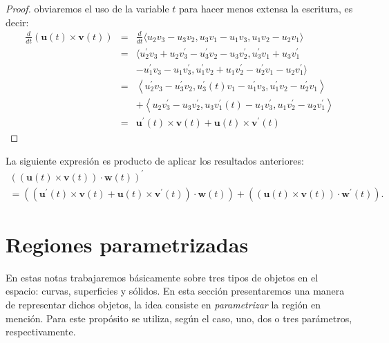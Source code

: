   \begin{proof}
    obviaremos el uso de la variable $t$ para hacer menos extensa la escritura, es decir:
    \begin{eqnarray*}
      \frac{d}{dt}\left( \mathbf{u}(t)\times \mathbf{v}(t)\right) &=& \frac{d}{dt} \langle u_{2} v_{3} -u_{3} v_{2} ,u_{3} v_{1} -u_{1} v_{3} ,u_{1} v_{2} -u_{2} v_{1} \rangle \\
      &=& \big\langle u_{2}^{\prime} v_{3}+u_{2} v_{3}^{\prime} -u_{3}^{\prime} v_{2} -u_{3} v_{2}^{\prime},u_{3}^{\prime} v_{1} +u_{3}v_{1}^{\prime} \\
      && -u_{1}^{\prime}v_{3} -u_{1} v_{3}^{\prime},   u_{1}^{\prime}v_{2}+u_{1}v_{2}^{\prime}  -u_{2}^{\prime} v_{1} -u_{2} v_{1}^{\prime} \big\rangle \\
      &=& \left\langle u_{2}^{\prime} v_{3}-u_{3}^{\prime} v_{2} ,u_{3}^{\prime}(t) v_{1} -u_{1}^{\prime} v_{3},u_{1}^{\prime} v_{2} -u_{2}^{\prime} v_{1} \right\rangle  \\
      && +\left\langle u_{2} v_{3}^{\prime} -u_{3}v_{2}^{\prime} ,u_{3} v_{1}^{\prime}(t) -u_{1} v_{3}^{\prime} ,u_{1} v_{2}^{\prime} -u_{2} v_{1}^{\prime} \right\rangle \\
      &=& \mathbf{u}^{\prime}(t)\times \mathbf{v}(t)+\mathbf{u}(t)\times \mathbf{v}^{\prime}(t)
    \end{eqnarray*}
  \end{proof}
  La siguiente expresión es producto de aplicar los resultados anteriores:
  \begin{gather*}
    \left( \left( \mathbf{u}(t)\times \mathbf{v}(t)\right)\cdot \mathbf{w}(t)\right)^{\prime} \\ = \left( \left( \mathbf{u}^{\prime}(t)\times \mathbf{v}(t)+\mathbf{u}(t)\times \mathbf{v}^{\prime}(t)\right) \cdot \mathbf{w}(t)\right) +\left( \left( \mathbf{u}(t)\times \mathbf{v}(t)\right)\cdot \mathbf{w}^{\prime}(t)\right).
  \end{gather*}

  \section{Regiones parametrizadas} \label{regionesparametrizadas}
  En estas notas trabajaremos básicamente sobre tres tipos de objetos en el espacio: curvas, superficies y sólidos.
  En esta sección presentaremos una manera de representar dichos objetos, la idea consiste en \emph{parametrizar} la región en mención. Para este propósito se utiliza, según el caso, uno, dos o tres parámetros, respectivamente.

